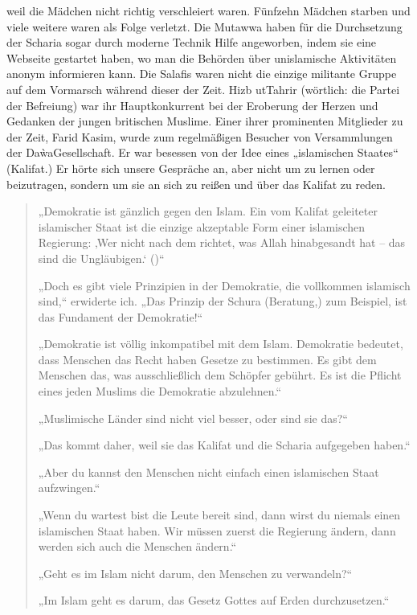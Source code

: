 \documentclass[12pt]{memoir}
\begin{document}
weil die Mädchen nicht richtig verschleiert waren.
Fünfzehn Mädchen starben und viele weitere waren als Folge verletzt.
Die Mutawwa haben für die Durchsetzung der Scharia
sogar durch moderne Technik Hilfe angeworben,
indem sie eine Webseite gestartet haben,
wo man die Behörden über unislamische Aktivitäten anonym informieren kann.
Die Salafis waren nicht die einzige militante Gruppe
auf dem Vormarsch während dieser der Zeit.
Hizb ut\–Tahrir (wörtlich: die Partei der Befreiung)
war ihr Hauptkonkurrent bei der Eroberung der Herzen und Gedanken
der jungen britischen Muslime.
Einer ihrer prominenten Mitglieder zu der Zeit, Farid Kasim,
wurde zum regelmäßigen Besucher von Versammlungen der Da\`wa\–Gesellschaft.
Er war besessen von der Idee eines „islamischen Staates“ (Kalifat.)
Er hörte sich unsere Gespräche an, aber nicht um zu lernen oder beizutragen,
sondern um sie an sich zu reißen und über das Kalifat zu reden.

\begin{quote}
„Demokratie ist gänzlich gegen den Islam.
Ein vom Kalifat geleiteter islamischer Staat
ist die einzige akzeptable Form einer islamischen Regierung:
‚Wer nicht nach dem richtet, was Allah hinabgesandt hat –
das sind die Ungläubigen.‘ ()“

„Doch es gibt viele Prinzipien in der Demokratie,
die vollkommen islamisch sind,“ erwiderte ich.
„Das Prinzip der Schura (Beratung,) zum Beispiel,
ist das Fundament der Demokratie!“

„Demokratie ist völlig inkompatibel mit dem Islam.
Demokratie bedeutet, dass Menschen das Recht haben Gesetze zu bestimmen.
Es gibt dem Menschen das, was ausschließlich dem Schöpfer gebührt.
Es ist die Pflicht eines jeden Muslims die Demokratie abzulehnen.“

„Muslimische Länder sind nicht viel besser, oder sind sie das?“

„Das kommt daher, weil sie das Kalifat und die Scharia aufgegeben haben.“

„Aber du kannst den Menschen nicht einfach
einen islamischen Staat aufzwingen.“

„Wenn du wartest bist die Leute bereit sind,
dann wirst du niemals einen islamischen Staat haben.
Wir müssen zuerst die Regierung ändern,
dann werden sich auch die Menschen ändern.“

„Geht es im Islam nicht darum, den Menschen zu verwandeln?“

„Im Islam geht es darum, das Gesetz Gottes auf Erden durchzusetzen.“
\end{quote}
\end{document}
